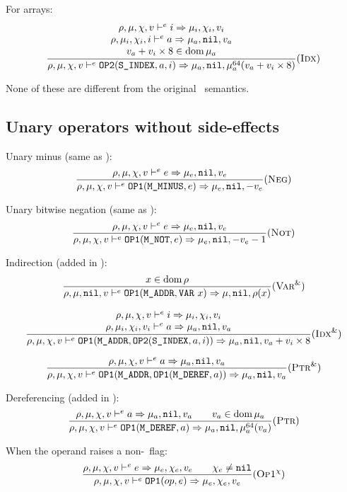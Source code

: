 For arrays:
\[\dfrac{\begin{array}{c}
    \rho,\mu,\chi,v \vdash^e i\Rightarrow \mu_i,\chi_i,v_i \\
    \rho,\mu_i,\chi_i,i \vdash^e a\Rightarrow \mu_a,\texttt{nil},v_a \\
    v_a+v_i\times 8\in\operatorname{dom}\mu_a
\end{array}}{\rho,\mu,\chi,v \vdash^e \texttt{OP2}(\texttt{S\_INDEX}, a, i) \Rightarrow \mu_a,\texttt{nil},\mu_a^{64}(v_a+v_i\times 8)}(\textsc{Idx})\]

None of these are different from the original \Cmm\ semantics.

\subsection{Unary operators without side-effects}
Unary minus (same as \Cmm):
\[\dfrac{
    \rho,\mu,\chi,v \vdash^e e \Rightarrow \mu_e,\texttt{nil},v_e
}{\rho,\mu,\chi,v \vdash^e \texttt{OP1}(\texttt{M\_MINUS}, e) \Rightarrow \mu_e,\texttt{nil},-v_e}(\textsc{Neg})\]

Unary bitwise negation (same as \Cmm):
\[\dfrac{
    \rho,\mu,\chi,v \vdash^e e\Rightarrow \mu_e,\texttt{nil},v_e
}{\rho,\mu,\chi,v \vdash^e \texttt{OP1}(\texttt{M\_NOT}, e) \Rightarrow \mu_e,\texttt{nil},-v_e-1}(\textsc{Not})\]


Indirection (added in \Cmp):
\[\dfrac{
    x\in\operatorname{dom}\rho
}{\rho,\mu,\texttt{nil},v \vdash^e \texttt{OP1}(\texttt{M\_ADDR}, \texttt{VAR}\ x)\Rightarrow \mu,\texttt{nil},\rho(x)}(\textsc{Var}^\&)\]

\[\dfrac{\begin{array}{c}
    \rho,\mu,\chi,v \vdash^e i\Rightarrow \mu_i,\chi_i,v_i \\
    \rho,\mu_i,\chi_i,v_i \vdash^e a\Rightarrow \mu_a,\texttt{nil},v_a \\
\end{array}}{\rho,\mu,\chi,v \vdash^e \texttt{OP1}(\texttt{M\_ADDR}, \texttt{OP2}(\texttt{S\_INDEX}, a, i)) \Rightarrow \mu_a,\texttt{nil},v_a+v_i\times 8}(\textsc{Idx}^\&)\]

\[\dfrac{
    \rho,\mu,\chi,v \vdash^e a \Rightarrow \mu_a,\texttt{nil},v_a
}{\rho,\mu,\chi,v \vdash^e \texttt{OP1}(\texttt{M\_ADDR}, \texttt{OP1}(\texttt{M\_DEREF}, a)) \Rightarrow \mu_a,\texttt{nil},v_a}(\textsc{Ptr}^\&)\]

Dereferencing (added in \Cmp):
\[\dfrac{
    \rho,\mu,\chi,v \vdash^e a\Rightarrow \mu_a,\texttt{nil},v_a \qquad v_a\in\operatorname{dom}\mu_a
}{\rho,\mu,\chi,v \vdash^e \texttt{OP1}(\texttt{M\_DEREF}, a) \Rightarrow \mu_a,\texttt{nil},\mu_a^{64}(v_a)}(\textsc{Ptr})\]

When the operand raises a non-\nil\ flag:
\[\dfrac{
    \rho,\mu,\chi,v \vdash^e e\Rightarrow \mu_e,\chi_e,v_e \qquad \chi_e\ne\texttt{nil}
}{\rho,\mu,\chi,v \vdash^e \texttt{OP1}(op, e) \Rightarrow \mu_e,\chi_e,v_e}(\textsc{Op1}^\chi)\]

